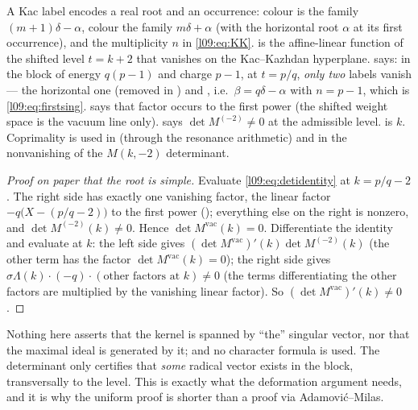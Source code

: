 \begin{dictionary}
A Kac label  encodes a real root and an occurrence: colour 
is the family $(m+1)\delta-\alpha$, colour  the family $m\delta+\alpha$ (with  the
horizontal root $\alpha$ at its first occurrence), and  the multiplicity $n$ in
\eqref{l09:eq:KK}.  is the affine-linear function of the shifted level
$t = k+2$ that vanishes on the Kac--Kazhdan hyperplane.  says: in the
block of energy $q(p-1)$ and charge $p-1$, at $t = p/q$, \emph{only two} labels vanish --- the
horizontal one (removed in ) and , i.e.\ $\beta = q\delta-\alpha$
with $n = p-1$, which is \eqref{l09:eq:firstsing}.  says that
factor occurs to the first power (the shifted weight space is the vacuum line only).
 says $\det M^{(-2)}\neq0$ at the admissible level.
 is $k$. Coprimality is used in  (through the
resonance arithmetic) and in the nonvanishing of the $M(k,-2)$ determinant.
\end{dictionary}

\begin{proof}[Proof on paper that the root is simple]
Evaluate \eqref{l09:eq:detidentity} at $k = p/q-2$. The right side has exactly one vanishing factor,
the linear factor $-q\bigl(X - (p/q-2)\bigr)$ to the first power ();
everything else on the right is nonzero, and $\det M^{(-2)}(k)\neq0$. Hence $\det M^{\mathrm{vac}}(k) = 0$.
Differentiate the identity and evaluate at $k$: the left side gives $(\det M^{\mathrm{vac}})'(k)\det M^{(-2)}(k)$
(the other term has the factor $\det M^{\mathrm{vac}}(k)=0$); the right side gives
$\sigma\Lambda(k)\cdot(-q)\cdot(\text{other factors at }k)\neq0$ (the terms differentiating the other factors are
multiplied by the vanishing linear factor). So $(\det M^{\mathrm{vac}})'(k)\neq0$.
\end{proof}

\begin{remark}
Nothing here asserts that the kernel is spanned by ``the'' singular vector, nor that the maximal ideal
is generated by it; and no character formula is used. The determinant only certifies that \emph{some}
radical vector exists in the block, transversally to the level. This is exactly what the deformation
argument needs, and it is why the uniform proof is shorter than a proof via Adamovi\'c--Milas.
\end{remark}

